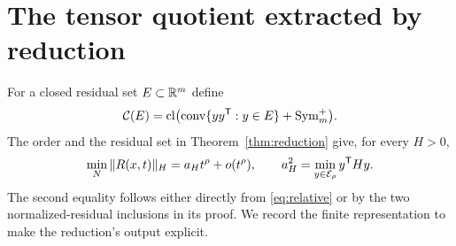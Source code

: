 \section{The tensor quotient extracted by reduction}\label{sec:tensors}
For a closed residual set $E\subset\mathbb R^m$ define
\[
 \mathcal C(E)=\operatorname{cl}\bigl(\operatorname{conv}\{yy^{\mathsf T}:y\in E\}+\operatorname{Sym}_m^+\bigr).
\]
The order and the residual set in Theorem~\ref{thm:reduction} give, for every $H>0$,
\begin{equation}\label{eq:metric-contact}
 \min_N\|R(x,t)\|_H=a_Ht^\rho+o(t^\rho),\qquad
 a_H^2=\min_{y\in\mathcal E_\rho}y^{\mathsf T}Hy.
\end{equation}
The second equality follows either directly from \eqref{eq:relative} or by the two normalized-residual inclusions in its proof. We record the finite representation to make the reduction's output explicit.

